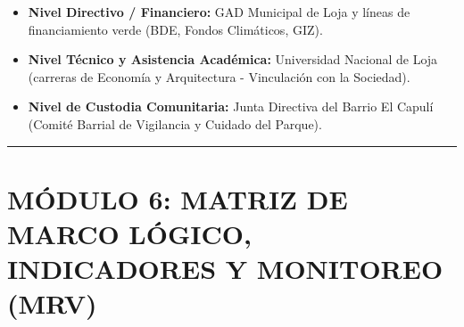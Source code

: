 \documentclass[
  letterpaper,
  DIV=11,
  numbers=noendperiod]{scrreprt}
\providecommand{\tightlist}{%
  \setlength{\itemsep}{0pt}\setlength{\parskip}{0pt}}
\begin{document}
\begin{itemize}
\tightlist
\item
  \textbf{Nivel Directivo / Financiero:} GAD Municipal de Loja y líneas
  de financiamiento verde (BDE, Fondos Climáticos, GIZ).
\item
  \textbf{Nivel Técnico y Asistencia Académica:} Universidad Nacional de
  Loja (carreras de Economía y Arquitectura - Vinculación con la
  Sociedad).
\item
  \textbf{Nivel de Custodia Comunitaria:} Junta Directiva del Barrio El
  Capulí (Comité Barrial de Vigilancia y Cuidado del Parque).
\end{itemize}

\begin{center}\rule{0.5\linewidth}{0.5pt}\end{center}

\chapter{MÓDULO 6: MATRIZ DE MARCO LÓGICO, INDICADORES Y MONITOREO
(MRV)}\label{muxf3dulo-6-matriz-de-marco-luxf3gico-indicadores-y-monitoreo-mrv}
\end{document}
